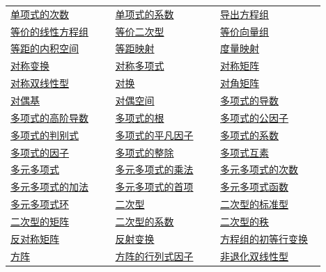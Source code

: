 \begin{longtable}{@{}>{\raggedright\arraybackslash}p{0.31\linewidth}>{\raggedright\arraybackslash}p{0.31\linewidth}>{\raggedright\arraybackslash}p{0.31\linewidth}@{}}
\hyperref[p1:concept:c1-l1278]{单项式的次数} & \hyperref[p1:concept:c1-l1278]{单项式的系数} & \hyperref[p1:concept:c2-l1057]{导出方程组}\\
\hyperref[p1:concept:c2-l7]{等价的线性方程组} & \hyperref[p1:concept:c7-l1182]{等价二次型} & \hyperref[p1:concept:c2-l528]{等价向量组}\\
\hyperref[p1:concept:c6-l531]{等距的内积空间} & \hyperref[p1:concept:c6-l516]{等距映射} & \hyperref[p1:concept:c6-l493]{度量映射}\\
\hyperref[p1:concept:c6-l1545]{对称变换} & \hyperref[p1:concept:c1-l1460]{对称多项式} & \hyperref[p1:concept:c3-l856]{对称矩阵}\\
\hyperref[p1:concept:c7-l668]{对称双线性型} & \hyperref[p1:concept:c3-l1870]{对换} & \hyperref[p1:concept:c3-l908]{对角矩阵}\\
\hyperref[p1:concept:c7-l150]{对偶基} & \hyperref[p1:concept:c7-l12]{对偶空间} & \hyperref[p1:concept:c1-l926]{多项式的导数}\\
\hyperref[p1:concept:c1-l926]{多项式的高阶导数} & \hyperref[p1:concept:c1-l991]{多项式的根} & \hyperref[p1:concept:c1-l644]{多项式的公因子}\\
\hyperref[p1:concept:c1-l2482]{多项式的判别式} & \hyperref[p1:concept:c1-l789]{多项式的平凡因子} & \hyperref[p1:concept:c1-l558]{多项式的系数}\\
\hyperref[p1:concept:c1-l634]{多项式的因子} & \hyperref[p1:concept:c1-l634]{多项式的整除} & \hyperref[p1:concept:c1-l644]{多项式互素}\\
\hyperref[p1:concept:c1-l1278]{多元多项式} & \hyperref[p1:concept:c1-l1334]{多元多项式的乘法} & \hyperref[p1:concept:c1-l1315]{多元多项式的次数}\\
\hyperref[p1:concept:c1-l1334]{多元多项式的加法} & \hyperref[p1:concept:c1-l1324]{多元多项式的首项} & \hyperref[p1:concept:c1-l1428]{多元多项式函数}\\
\hyperref[p1:concept:c1-l1278]{多元多项式环} & \hyperref[p1:concept:c7-l1012]{二次型} & \hyperref[p1:concept:c7-l1031]{二次型的标准型}\\
\hyperref[p1:concept:c7-l1056]{二次型的矩阵} & \hyperref[p1:concept:c7-l1027]{二次型的系数} & \hyperref[p1:concept:c7-l1056]{二次型的秩}\\
\hyperref[p1:concept:c3-l856]{反对称矩阵} & \hyperref[p1:concept:c6-l809]{反射变换} & \hyperref[p1:concept:c2-l47]{方程组的初等行变换}\\
\hyperref[p1:concept:c2-l654]{方阵} & \hyperref[p1:concept:c5-l2373]{方阵的行列式因子} & \hyperref[p1:concept:c7-l392]{非退化双线性型}\\

\end{longtable}

